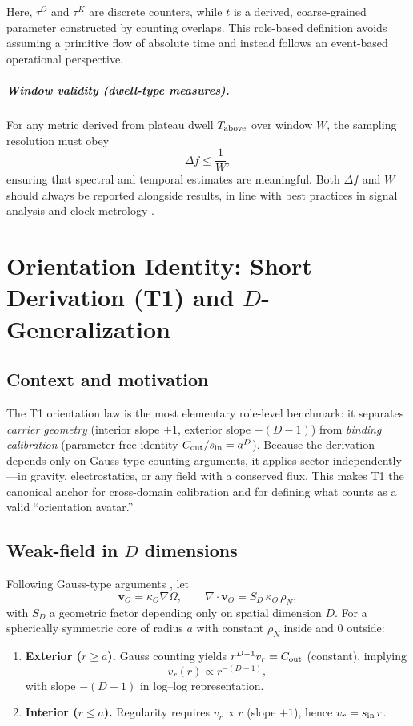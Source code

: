 \documentclass[12pt,a4paper,oneside]{scrreprt}
\begin{document}
Here, $\tau^O$ and $\tau^K$ are discrete counters, while $t$ is a derived, coarse-grained parameter constructed by counting overlaps. This role-based definition avoids assuming a primitive flow of absolute time and instead follows an event-based operational perspective.

\paragraph{Window validity (dwell-type measures).}
For any metric derived from plateau dwell $T_{\rm above}$ over window $W$, the sampling resolution must obey
\[
\Delta f \le \frac{1}{W},
\]
ensuring that spectral and temporal estimates are meaningful. Both $\Delta f$ and $W$ should always be reported alongside results, in line with best practices in signal analysis and clock metrology \cite{allan1987time,bipm2019si}.

\chapter{Orientation Identity: Short Derivation (T1) and $D$-Generalization}\label{app:T1}

\section*{Context and motivation}
The T1 orientation law is the most elementary role-level benchmark: it separates
\emph{carrier geometry} (interior slope $+1$, exterior slope $-(D-1)$) from
\emph{binding calibration} (parameter-free identity $C_{\rm out}/s_{\rm in}=a^D$).
Because the derivation depends only on Gauss-type counting arguments, it applies
sector-independently—in gravity, electrostatics, or any field with a conserved flux.
This makes T1 the canonical anchor for cross-domain calibration and for defining
what counts as a valid ``orientation avatar.'' 

\section*{Weak-field in $D$ dimensions}
Following Gauss-type arguments \cite{jackson1999classical,poisson2014gravity}, let
\[
\mathbf v_O=\kappa_O\nabla\Omega,\qquad \nabla\!\cdot\mathbf v_O=S_D\,\kappa_O\,\rho_N,
\]
with $S_D$ a geometric factor depending only on spatial dimension $D$.  
For a spherically symmetric core of radius $a$ with constant $\rho_N$ inside and $0$ outside:

\begin{enumerate}
\item \textbf{Exterior ($r\ge a$).}  
Gauss counting yields $r^{D-1}v_r=C_{\rm out}$ (constant), implying
\[
v_r(r)\propto r^{-(D-1)},
\]
with slope $-(D-1)$ in log–log representation.

\item \textbf{Interior ($r\le a$).}  
Regularity requires $v_r\propto r$ (slope $+1$), hence $v_r=s_{\rm in}\,r$.
\end{enumerate}
\end{document}
